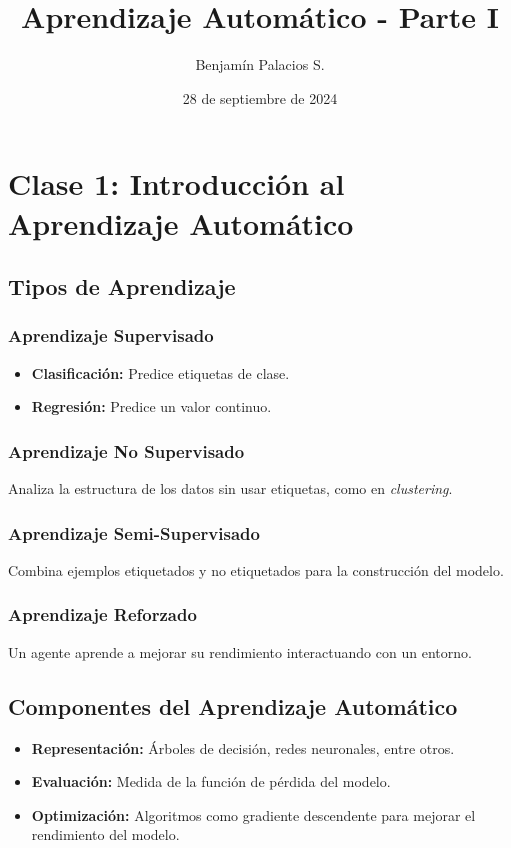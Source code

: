 \documentclass[a4paper, 11pt]{article}
\title{Aprendizaje Automático - Parte I}
\author{Benjamín Palacios S.}
\date{28 de septiembre de 2024}
\begin{document}
\maketitle

\section{Clase 1: Introducción al Aprendizaje Automático}

\subsection{Tipos de Aprendizaje}

\subsubsection{Aprendizaje Supervisado}
\begin{itemize}
    \item \textbf{Clasificación:} Predice etiquetas de clase.
    \item \textbf{Regresión:} Predice un valor continuo.
\end{itemize}

\subsubsection{Aprendizaje No Supervisado}
Analiza la estructura de los datos sin usar etiquetas, como en \textit{clustering}.

\subsubsection{Aprendizaje Semi-Supervisado}
Combina ejemplos etiquetados y no etiquetados para la construcción del modelo.

\subsubsection{Aprendizaje Reforzado}
Un agente aprende a mejorar su rendimiento interactuando con un entorno.

\subsection{Componentes del Aprendizaje Automático}
\begin{itemize}
    \item \textbf{Representación:} Árboles de decisión, redes neuronales, entre otros.
    \item \textbf{Evaluación:} Medida de la función de pérdida del modelo.
    \item \textbf{Optimización:} Algoritmos como gradiente descendente para mejorar el rendimiento del modelo.
\end{itemize}
\end{document}
